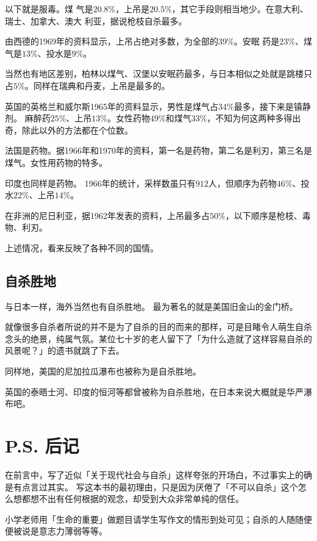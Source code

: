 \documentclass[UTF8]{ctexart}
\begin{document}
以下就是服毒。煤 气是$20.8\%$，上吊是$20.5\%$，其它手段则相当地少。在意大利、瑞士、加拿大、澳大 利亚，据说枪枝自杀最多。

由西德的1969年的资料显示，上吊占绝对多数，为全部的$39\%$。安眠 药是$23\%$、煤气是$13\%$、投水是$9\%$。

当然也有地区差别，柏林以煤气、汉堡以安眠药最多，与日本相似之处就是跳楼只占$5\%$。同样在瑞典和丹麦，上吊是最多的。

英国的英格兰和威尔斯1965年的资料显示，男性是煤气占$34\%$最多，接下来是镇静剂。 
麻醉药$25\%$、上吊$13\%$。女性药物$49\%$和煤气$33\%$，不知为何这两种多得出奇，除此以外的方法都在个位数。

法国是药物。据1966年和1970年的资料，第一名是药物，第二名是利刃，第三名是煤气。女性用药物的特多。

印度也同样是药物。
1966年的统计，采样数虽只有$912$人，但顺序为药物$46\%$、投水$22\%$、上吊$14\%$。

在非洲的尼日利亚，据1962年发表的资料，上吊最多占$50\%$，以下顺序是枪枝、毒物、利刃。

上述情况，看来反映了各种不同的国情。

\subsection{自杀胜地}

与日本一样，海外当然也有自杀胜地。
最为著名的就是美国旧金山的金门桥。

就像很多自杀者所说的并不是为了自杀的目的而来的那样，可是目睹令人萌生自杀念头的绝景，纯属气氛。某位七十岁的老人留下了「为什么造就了这样容易自杀的风景呢？」的遗书就跳了下去。

同样地，美国的尼加拉瓜瀑布也被称为是自杀胜地。

英国的泰晤士河、印度的恒河等都曾被称为自杀胜地，在日本来说大概就是华严瀑布吧。



\newpage

\section{P.S. 后记}

在前言中，写了近似「关于现代社会与自杀」这样夸张的开场白，不过事实上的确是有点言过其实。
写这本书的最初理由，只是因为厌倦了「不可以自杀」这个怎么想都想不出有任何根据的观念，却受到大众非常单纯的信任。

小学老师用「生命的重要」做题目请学生写作文的情形到处可见；自杀的人随随便便被说是意志力薄弱等等。
\end{document}
